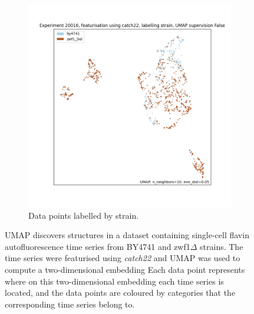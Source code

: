 \begin{figure}
  \begin{subfigure}[t]{0.7\textwidth}
  \centering
    \includegraphics[width=\linewidth]{Figure_13}
    \caption{
      Data points labelled by strain.
    }
    \label{fig:umap-strain}
  \end{subfigure}

  \caption[
    UMAP discovers structures in a dataset containing single-cell flavin autofluorescence time series from BY4741 and zwf1$\Delta$ strains
  ]{
    UMAP discovers structures in a dataset containing single-cell flavin autofluorescence time series from BY4741 and zwf1$\Delta$ strains.
    The time series were featurised using \textit{catch22} and UMAP was used to compute a two-dimensional embedding
    Each data point represents where on this two-dimensional embedding each time series is located, and the data points are coloured by categories that the corresponding time series belong to.
  }
  \label{fig:umap}
\end{figure}

